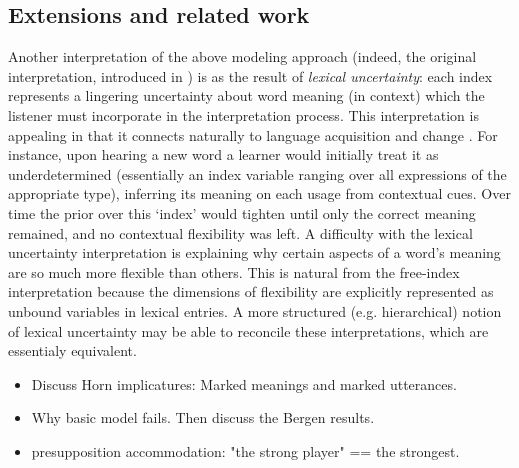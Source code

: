\documentclass[pdfextras]{handbook}
\newcommand{\llbracket}{\ensuremath{\left [\!\left [}}%
\newcommand{\rrbracket}{\ensuremath{\right ]\!\right ]}}
\providecommand{\sv}[1]{\ensuremath{\llbracket \mathit{#1} \rrbracket}}
\begin{document}
\subsection{Extensions and related work}



Another interpretation of the above modeling approach (indeed, the original interpretation, introduced in \cite{bergen12}) is as the result of \emph{lexical uncertainty}: each index represents a lingering uncertainty about word meaning (in context) which the listener must incorporate in the interpretation process. 
This interpretation is appealing in that it connects naturally to language acquisition and change \citep{SmithFrankGoodman}. 
For instance, upon hearing a new word a learner would initially treat it as underdetermined (essentially an index variable ranging over all expressions of the appropriate type), inferring its meaning on each usage from contextual cues. 
Over time the prior over this `index' would tighten until only the correct meaning remained, and no contextual flexibility was left. 
A difficulty with the lexical uncertainty interpretation is explaining why certain aspects of a word's meaning are so much more flexible than others. 
This is natural from the free-index interpretation because the dimensions of flexibility are explicitly represented as unbound variables in lexical entries. 
A more structured (e.g. hierarchical) notion of lexical uncertainty may be able to reconcile these interpretations, which are essentialy equivalent.




\begin{itemize}
\item Discuss Horn implicatures:  Marked meanings and marked utterances.
\item Why basic model fails. Then discuss the Bergen results.

\item  presupposition accommodation: "the strong player" == the strongest.
\end{itemize}
\end{document}
